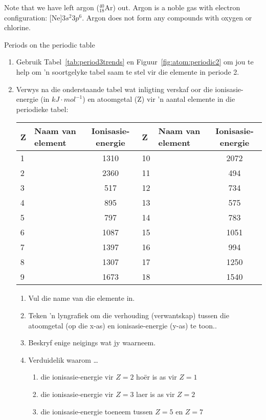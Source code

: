 Note that we have left argon ($^{40}_{18}\text{Ar}$) out. Argon is a noble gas with electron configuration: $\text{[Ne]}3s^{2}3p^{6}$. Argon does not form any compounds with oxygen or chlorine.
\begin{exercises}{Periods on the periodic table}
{
\begin{enumerate}[noitemsep, label=\textbf{\arabic*}. ]
\item Gebruik Tabel~\ref{tab:period3trends} en Figuur~\ref{fig:atom:periodic2} om jou te help om 'n soortgelyke tabel saam te stel vir die elemente in periode 2.
\item Verwys na die onderstaande tabel wat inligting verskaf oor die ionisasie-energie (in $kJ \cdot mol^{-1}$) en atoomgetal (Z) vir 'n aantal elemente in die periodieke tabel:\\
\begin{center}
\begin{tabular}{|l|l|c|l|l|c|}\hline
\textbf{Z} & Naam van element & Ionisasie-energie & \textbf{Z} & Naam van element & Ionisasie-energie \\\hline
1 &   & 1310 & 10 &        & 2072 \\\hline
2 &     & 2360 & 11 &      & 494  \\\hline
3 &    & 517  & 12 &   & 734  \\\hline
4 &  & 895  & 13 &   & 575  \\\hline
5 &      & 797  & 14 &     & 783  \\\hline
6 &     & 1087 & 15 &  & 1051 \\\hline
7 &   & 1397 & 16 &     & 994  \\\hline
8 &     & 1307 & 17 &    & 1250 \\\hline
9 &   & 1673 & 18 &       & 1540 \\\hline
\end{tabular}
\end{center}

\begin{enumerate}[noitemsep, label=\textbf{\alph*}. ]
 \item Vul die name van die elemente in.
\item Teken 'n lyngrafiek om die verhouding (verwantskap) tussen die atoomgetal (op die x-as) en ionisasie-energie (y-as) te toon..
\item Beskryf enige neigings wat jy waarneem.
\item Verduidelik waarom \ldots
	\begin{enumerate}[noitemsep, label=\textbf{\roman*}. ]
	\item die ionisasie-energie vir $Z=2$ ho\"{e}r is as vir $Z=1$
	\item die ionisasie-energie vir $Z=3$ laer is as vir $Z=2$
	\item die ionisasie-energie toeneem tussen $Z=5$ en $Z=7$
	\end{enumerate}


\end{enumerate}
\end{enumerate}}
\end{exercises}
